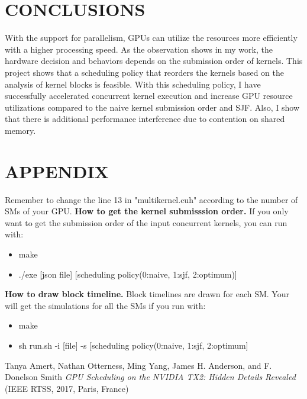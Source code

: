 \documentclass[12pt,journal,compsoc]{IEEEtran}
\begin{document}
\section{CONCLUSIONS}
With the support for parallelism, GPUs can utilize the resources more efficiently with a higher processing speed. As the observation shows in my work, the hardware decision and behaviors depends on the submission order of kernels. This project shows that a scheduling policy that reorders the kernels based on the analysis of kernel blocks is feasible. With this scheduling policy, I have successfully accelerated concurrent kernel execution and increase GPU resource utilizations compared to the naive kernel submission order and SJF. Also, I show that there is additional performance interference due to contention on shared memory.

\section*{APPENDIX}
Remember to change the line 13 in "multikernel.cuh" according to the number of SMs of your GPU.\newline
\textbf{How to get the kernel submisssion order.}
If you only want to get the submission order of the input concurrent kernels, you can run with: 
\begin{itemize}
   \item make
   \item ./exe [json file] [scheduling policy(0:naive, 1:sjf,  2:optimum)]
\end{itemize}
\textbf{How to draw block timeline.} Block timelines are drawn for each SM. Your will get the simulations for all the SMs if you run with:
\begin{itemize}
   \item make
   \item sh run.sh -i [file] -s [scheduling policy(0:naive, 1:sjf, 2:optimum]
\end{itemize}

\begin{thebibliography}{99}
 Tanya Amert, Nathan Otterness, Ming Yang, James H. Anderson, and F. Donelson Smith \emph{GPU Scheduling on the NVIDIA TX2: Hidden Details Revealed} (IEEE RTSS, 2017, Paris, France)
\end{thebibliography}
\end{document}
